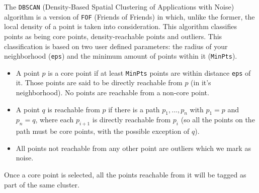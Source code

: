 \documentclass[12pt]{article}
\begin{document}
The \texttt{DBSCAN} (Density-Based Spatial Clustering of Applications with Noise) algorithm is a version of \texttt{FOF} (Friends of Friends) in which, unlike the former, the local density of a point is taken into consideration. This algorithm classifies points as being core points, density-reachable points and outliers. This classification is based on two user defined parameters: the radius of your neighborhood (\texttt{eps}) and the minimum amount of points within it (\texttt{MinPts}). \cite{DBSCAN}

\begin{itemize}
\item A point $p$ is a core point if at least \texttt{MinPts} points are within distance \texttt{eps} of it. Those points are said to be directly reachable from $p$ (in it's neighborhood). No points are reachable from a non-core point.
\item A point $q$ is reachable from $p$ if there is a path $p_1, ..., p_n$ with $p_1 = p$ and $p_n = q$, where each $p_{i+1}$ is directly reachable from $p_i $ (so all the points on the path must be core points, with the possible exception of $q$).
\item All points not reachable from any other point are outliers which we mark as noise.
\end{itemize}

Once a core point is selected, all the points reachable from it will be tagged as part of the same cluster.

\FloatBarrier
\end{document}
